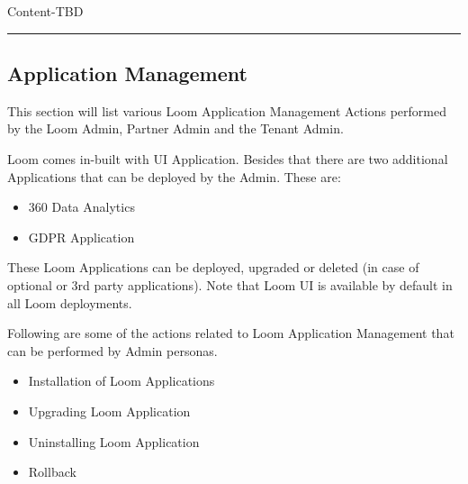 \documentclass[letterpaper,10pt,english]{sphinxmanual}
\begin{document}
Content-TBD


\bigskip\hrule\bigskip



\subsection{Application Management}
\label{\detokenize{loom_getting_started_guide:application-management}}
This section will list various Loom  Application Management Actions performed by the Loom Admin, Partner Admin and the Tenant Admin.

Loom comes in-built with UI Application.  Besides that there are two additional Applications that can be deployed by the Admin.  These are:
\begin{itemize}
\item {} 
360 Data Analytics

\item {} 
GDPR Application

\end{itemize}

These Loom Applications can be deployed, upgraded or deleted (in case of optional or 3rd party applications). Note that Loom UI is available by default in all Loom deployments.

Following are some of the actions related to Loom Application Management that can be performed by Admin personas.
\begin{itemize}
\item {} 
Installation of Loom Applications

\item {} 
Upgrading Loom Application

\item {} 
Uninstalling Loom Application

\item {} 
Rollback

\end{itemize}
\end{document}
